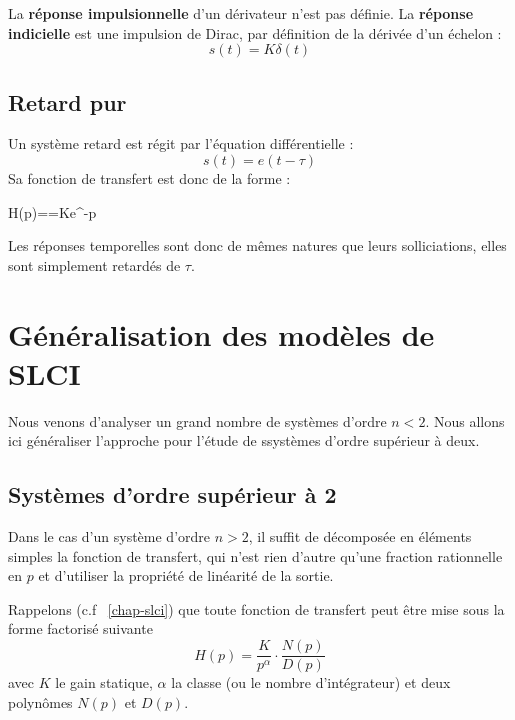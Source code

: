 La \textbf{réponse impulsionnelle} d'un dérivateur n'est pas définie. 
La \textbf{réponse indicielle} est une impulsion de Dirac, par définition de la dérivée d'un échelon :
$$
s(t)=K\delta(t)
$$

\subsection{Retard pur}
Un système retard est régit par l'équation différentielle :
$$
s(t)=e(t-\tau)
$$
Sa fonction de transfert est donc de la forme :
\begin{bequation}
H(p)==Ke^{-\tau p}
\end{bequation}
Les réponses temporelles sont donc de mêmes natures que leurs solliciations, 
elles sont simplement retardés de $\tau$.

\newpage
\section{Généralisation des modèles de SLCI}

Nous venons d'analyser un grand nombre de systèmes d'ordre $n<2$. 
Nous allons ici généraliser l'approche pour l'étude de ssystèmes d'ordre supérieur à deux.

\subsection{Systèmes d'ordre supérieur à 2}
Dans le cas d'un système d'ordre $n>2$, il suffit de décomposée en éléments simples 
la fonction de transfert, qui n'est rien d'autre qu'une fraction rationnelle en $p$ et 
d'utiliser la propriété de linéarité de la sortie.

Rappelons (c.f ~\cref{chap-slci}) que toute fonction de transfert peut être 
mise sous la forme factorisé suivante  
$$
H(p)=\dfrac{K}{p^\alpha}\cdot\dfrac{N(p)}{D(p)}
$$
avec $K$ le gain statique, $\alpha$ la classe (ou le nombre d'intégrateur) et 
deux polynômes $N(p)$ et $D(p)$.

